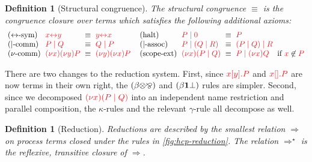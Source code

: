 \documentclass[submission,copyright,creativecommons]{eptcs}
\newtheorem{definition}[lemma]{Definition}
\begin{document}
\begin{definition}[Structural congruence]\label{def:hcp-equiv}
  The structural congruence $\equiv$ is the congruence closure over terms which satisfies the following additional axioms:
  \[
    \setlength{\arraycolsep}{3pt}
    \begin{array}{llcllllcll}
        \cpEquivLinkComm
      & \tm{\cpLink{x}{y}}
      & \equiv
      & \tm{\cpLink{y}{x}}
      &
      &
        \hccpEquivMixHalt1
      & \tm{\piPar{P}{\piHalt}}
      & \equiv
      & \tm{P}
      &
      \\
        \hccpEquivMixComm
      & \tm{\piPar{P}{Q}}
      & \equiv
      & \tm{\piPar{Q}{P}}
      &
      &
        \hccpEquivMixAss1
      & \tm{\piPar{P}{( \piPar{Q}{R} )}}
      & \equiv
      & \tm{\piPar{( \piPar{P}{Q} )}{R}}
      &
      \\
        \hccpEquivNewComm
      & \tm{\piNew{x}{\piNew{y}{P}}}
      & \equiv
      & \tm{\piNew{y}{\piNew{x}{P}}}
      &
      &
        \hccpEquivScopeExt1
      & \tm{\piNew{x}{( \piPar{P}{Q} )}}
      & \equiv
      & \tm{\piPar{P}{\piNew{x}{Q}}}
      & \text{if }\notFreeIn{x}{P}
    \end{array}
  \]
\end{definition}\noindent
There are two changes to the reduction system. First, since $\tm{\piBoundSend{x}{y}{P}}$ and $\tm{\piBoundSend{x}{}{P}}$ are now terms in their own right, the $(\beta{\ensuremath{\otimes}}{\mathbin{\bindnasrepma}})$ and $(\beta{\ensuremath{\mathbf{1}}}{\bot})$ rules are simpler. Second, since we decomposed $\tm{\cpCut{x}{P}{Q}}$ into an independent name restriction and parallel composition, the $\kappa$-rules and the relevant $\gamma$-rule all decompose as well.
\begin{definition}[Reduction]\label{def:hcp-reduction}
  Reductions are described by the smallest relation $\Longrightarrow$ on process terms closed under the rules in \cref{fig:hcp-reduction}. The relation $\Longrightarrow^\star$ is the reflexive, transitive closure of $\Longrightarrow$.
\end{definition}
\end{document}
